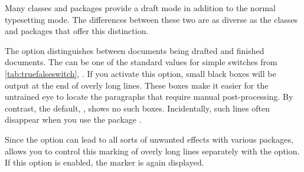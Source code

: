 Many classes and packages provide a draft mode in addition to the normal
typesetting mode. The differences between these two are as diverse as
the classes and packages that offer this distinction.%

\begin{Declaration}
\end{Declaration}%
The  option distinguishes between documents being drafted and finished
documents. The  can be one of the
standard values for simple switches from \autoref{tab:truefalseswitch},
. If you activate this
option, small black boxes will be output
at the end of overly long lines. These boxes make it easier for the untrained
eye to locate the paragraphs that require manual post-processing. By contrast,
the default, , shows no such boxes. Incidentally,
such lines often disappear when you use the
package \cite{package:microtype}.

Since the  option can lead to all sorts of unwanted effects with
various packages, \KOMAScript{} allows you to control this marking of overly
long lines separately with the
 option.  If
this option is enabled, the marker is again displayed.%
% 
\EndIndexGroup
%
\EndIndexGroup

